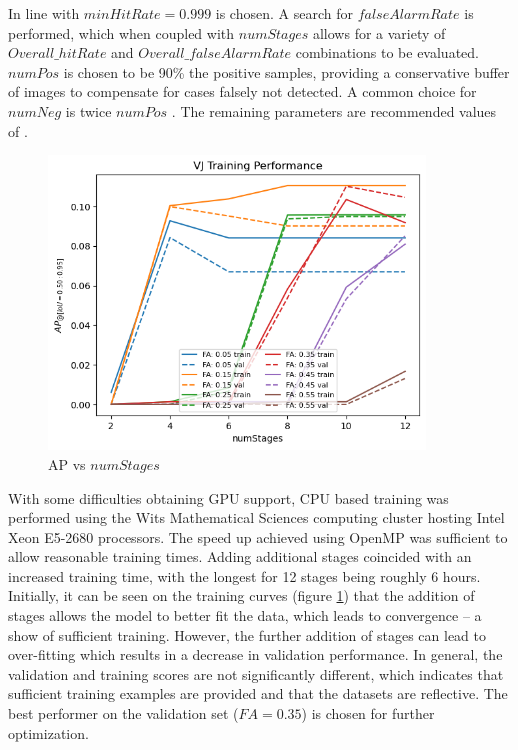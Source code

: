 \documentclass[a4paper,twoside,12pt]{report}
\begin{document}
In line with \cite{robovj} $minHitRate = 0.999$ is chosen. A search for $falseAlarmRate$ is performed, which when coupled with $numStages$ allows for a variety of $Overall\_hitRate$ and $Overall\_falseAlarmRate$ combinations to be evaluated. $numPos$ is chosen to be 90\% the positive samples, providing a conservative buffer of images to compensate for cases falsely not detected. A common choice for $numNeg$ is twice $numPos$ \citep{numneg}. The remaining parameters are recommended values of \cite{vjdataset}.

\begin{figure}[h!]
\begin{center}
\includegraphics[width=10cm]{images/vj_training.png}
\caption{AP vs $numStages$}
\label{fig:vjstages}
\end{center}
\end{figure}

With some difficulties obtaining GPU support, CPU based training was performed using the Wits Mathematical Sciences computing cluster hosting Intel Xeon E5-2680 processors. The speed up achieved using OpenMP was sufficient to allow reasonable training times. Adding additional stages coincided with an increased training time, with the longest for 12 stages being roughly 6 hours. Initially, it can be seen on the training curves (figure \ref{fig:vjstages}) that the addition of stages allows the model to better fit the data, which leads to convergence -- a show of sufficient training. However, the further addition of stages can lead to over-fitting which results in a decrease in validation performance. In general, the validation and training scores are not significantly different, which indicates that sufficient training examples are provided and that the datasets are reflective. The best performer on the validation set ($FA=0.35$) is chosen for further optimization.
\end{document}
